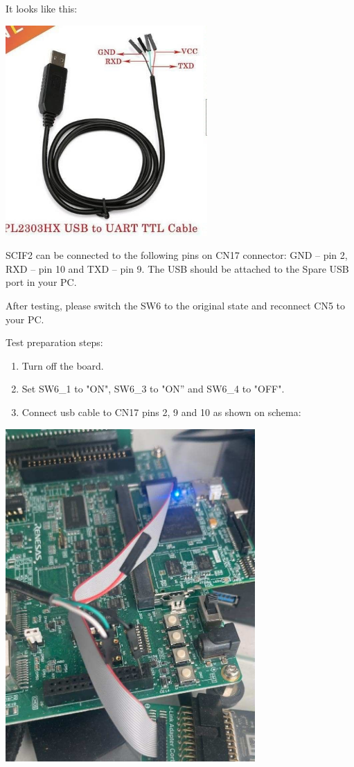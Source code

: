 \documentclass[11pt,a4paper,oneside]{article}
\begin{document}
It looks like this:

\includegraphics[width=3.03125in,height=3.16708in]{./media/cable.jpg}

SCIF2 can be connected to the following pins on CN17 connector:
GND -- pin 2, RXD -- pin 10 and TXD -- pin 9. The USB should be attached
to the Spare USB port in your PC.

After testing, please switch the SW6 to the original state and reconnect
CN5 to your PC.

Test preparation steps:

\begin{enumerate}
\def\labelenumi{\arabic{enumi})}
\item
  Turn off the board.
\item
  Set SW6\_1 to "ON", SW6\_3 to "ON'' and SW6\_4 to "OFF".
\item
  Connect usb cable to CN17 pins 2, 9 and 10 as shown on schema:
\end{enumerate}

\includegraphics[width=3.75in,height=5in]{./media/scif2_conn.jpg}
\end{document}
